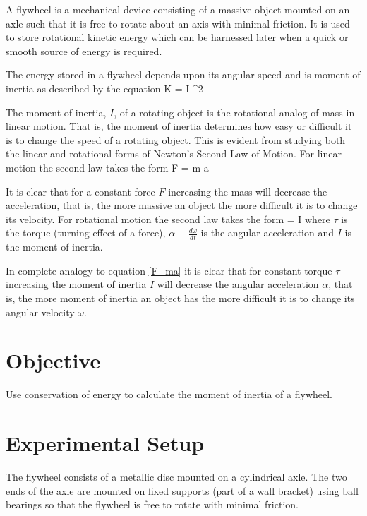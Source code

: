 A flywheel is a mechanical device consisting of a massive object mounted on an axle such that it is free to rotate about an axis with minimal friction. It is used to store rotational kinetic energy which can be harnessed later when a quick or smooth source of energy is required.

The energy stored in a flywheel depends upon its angular speed and is moment of inertia as described by the equation
%
\beq
    K =  I \omega^2
\eeq
%

The moment of inertia, $I$, of a rotating object is the rotational analog of mass in linear motion. That is, the moment of inertia determines how easy or difficult it is to change the speed of a rotating object. This is evident from studying both the linear and rotational forms of Newton's Second Law of Motion. For linear motion the second law takes the form
%
\beq \label{F_ma}
    F = m a
\eeq

It is clear that for a constant force $F$ increasing the mass will decrease the acceleration, that is, the more massive an object the more difficult it is to change its velocity. For rotational motion the second law takes the form
%
\beq
    \tau = I \alpha
\eeq
%
where $\tau$ is the torque (turning effect of a force), $\displaystyle \alpha \equiv \frac{d \omega}{dt}$ is the angular acceleration and $I$ is the moment of inertia.

In complete analogy to equation \eqref{F_ma} it is clear that for constant torque $\tau$ increasing the moment of inertia $I$ will decrease the angular acceleration $\alpha$, that is, the more moment of inertia an object has the more difficult it is to change its angular velocity $\omega$.

\section{Objective}

    Use conservation of energy to calculate the moment of inertia of a flywheel.

\section{Experimental Setup}

    The flywheel consists of a metallic disc mounted on a cylindrical axle. The two ends of the axle are mounted on fixed supports (part of a wall bracket) using ball bearings so that the flywheel is free to rotate with minimal friction.

